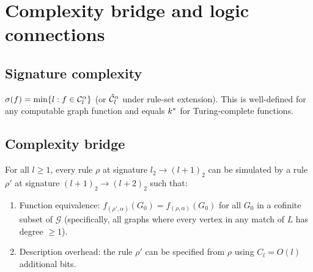 \documentclass{../shared/primo}
\begin{document}
\section{Complexity bridge and logic connections}
\label{sec:bridge}

\subsection{Signature complexity}

\begin{definition}
$\sigma(f) = \min\{l : f \in \mathcal{C}_{l}^{\alpha}\}$ (or $\hat{\mathcal{C}}_{l}^{\alpha}$ under rule-set extension). This is well-defined for any computable graph function and equals $k^*$ for Turing-complete functions.
\end{definition}

\subsection{Complexity bridge}

\begin{theorem}\label{thm:bridge-body}
For all $l \geq 1$, every rule $\rho$ at signature $l_2 \to (l{+}1)_2$ can be simulated by a rule $\rho'$ at signature $(l{+}1)_2 \to (l{+}2)_2$ such that:
\begin{enumerate}
\item[\textup{(a)}] Function equivalence: $f_{(\rho', \alpha)}(G_0) = f_{(\rho, \alpha)}(G_0)$ for all $G_0$ in a cofinite subset of $\mathcal{G}$ (specifically, all graphs where every vertex in any match of $L$ has degree $\geq 1$).
\item[\textup{(b)}] Description overhead: the rule $\rho'$ can be specified from $\rho$ using $C_l = O(l)$ additional bits.
\end{enumerate}
\end{theorem}
\end{document}
